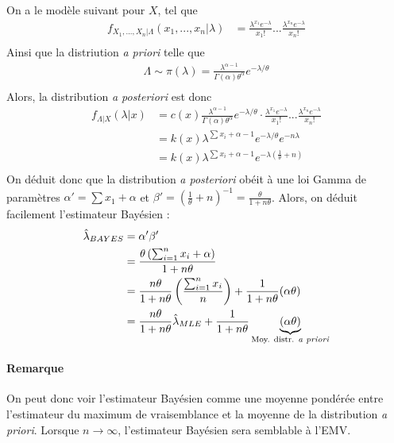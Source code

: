 \documentclass[12pt, french]{report}
\begin{document}
\begin{exemple}
On a le modèle suivant pour $X$, tel que
\begin{align*}
f_{X_1, ..., X_n | \Lambda}(x_1, ..., x_n | \lambda) & = \frac{\lambda^{x_1} e^{-\lambda}}{x_1 ! } ... \frac{\lambda^{x_n} e^{-\lambda}}{x_n !} \\
\end{align*}
Ainsi que la distriution \emph{a priori} telle que
\begin{align*}
\Lambda \sim \pi(\lambda) = \frac{\lambda^{\alpha -1}}{\Gamma(\alpha) \theta^{\alpha}} e^{-\lambda / \theta} \\
\end{align*}
Alors, la distribution \emph{a posteriori} est donc
\begin{align*}
f_{\Lambda | X}(\lambda | x)	& = c(x) \frac{\lambda^{\alpha-1}}{\Gamma(\alpha) \theta^{\alpha}} e^{-\lambda / \theta} \cdot \frac{\lambda^{x_1} e^{-\lambda}}{x_1 !} ... \frac{\lambda^{x_n} e^{-\lambda}}{x_n !} \\
& = k(x) \lambda^{\sum x_i + \alpha - 1} e^{-\lambda/ \theta} e^{-n \lambda} \\
& = k(x) \lambda^{\sum x_i + \alpha - 1} e^{-\lambda \left( \frac{1}{\theta} + n \right)} \\
\end{align*}
On déduit donc que la distribution \emph{a posteriori} obéit à une loi Gamma de paramètres $\alpha' = \sum x_1 + \alpha$ et $\beta' =\left( \frac{1}{\theta} + n \right)^{-1} = \frac{\theta}{1 + n \theta}$. Alors, on déduit facilement l'estimateur Bayésien : 
\begin{align*}
\hat{\lambda}_{BAYES} & = \alpha' \beta' \\
& =\frac{ \theta \left( \sum_{i=1}^{n} x_i + \alpha \right)}{1 + n \theta} \\
& =  \frac{n \theta}{1 + n \theta} \left( \frac{\sum_{i=1}^{n} x_i}{n} \right) + \frac{1}{1 + n \theta} (\alpha \theta) \\
& = \frac{n \theta}{1 + n \theta} \hat{\lambda}_{MLE} + \frac{1}{1 + n \theta} \underbrace{(\alpha \theta)}_{\text{Moy. distr. \emph{a priori}}} \\
\end{align*}
\end{exemple}
\paragraph{Remarque} On peut donc voir l'estimateur Bayésien comme une moyenne pondérée entre l'estimateur du maximum de vraisemblance et la moyenne de la distribution \emph{a priori}. Lorsque $n \to \infty$, l'estimateur Bayésien sera semblable à l'EMV.
\end{document}
